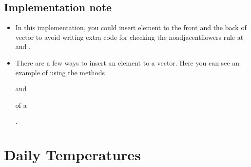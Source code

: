 \documentclass[letterpaper,12pt,english]{book}
\begin{document}
\subsection{Implementation note}
\label{\detokenize{Array/01_ARR_605_Can_Place_Flowers:implementation-note}}\begin{itemize}
\item {} 
\sphinxAtStartPar
In this implementation, you could insert element  to the front and the back of vector  to avoid writing extra code for checking the no\sphinxhyphen{}adjacent\sphinxhyphen{}flowers rule at  and .

\item {} 
\sphinxAtStartPar
There are a few ways to insert an element to a vector. Here you can see an example of using the methods %
\begin{footnote}[11]\sphinxAtStartFootnote
{}
%
\end{footnote} and %
\begin{footnote}[12]\sphinxAtStartFootnote
{}
%
\end{footnote} of a %
\begin{footnote}[13]\sphinxAtStartFootnote
{}
%
\end{footnote}.

\end{itemize}

\sphinxstepscope


\section{Daily Temperatures}
\label{\detokenize{Array/01_ARR_739_Daily_Temperatures:daily-temperatures}}\label{\detokenize{Array/01_ARR_739_Daily_Temperatures::doc}}
\end{document}
